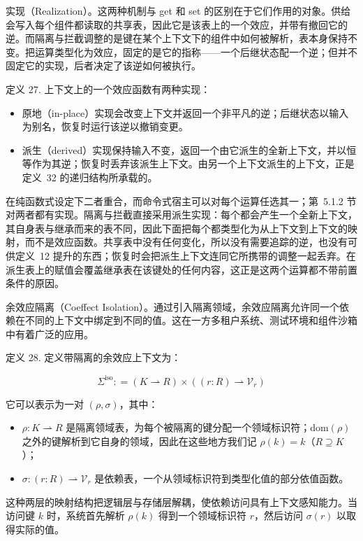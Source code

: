 实现（Realization）。这两种机制与 get 和 set 的区别在于它们作用的对象。供给会写入每个组件都读取的共享表，因此它是该表上的一个效应，并带有撤回它的逆。而隔离与拦截调整的是键在某个上下文下的组件中如何被解析，表本身保持不变。把运算类型化为效应，固定的是它的指称——一个后继状态配一个逆；但并不固定它的实现，后者决定了该逆如何被执行。

定义 27. 上下文上的一个效应函数有两种实现：

\begin{itemize}
\item 原地（in-place）实现会改变上下文并返回一个非平凡的逆；后继状态以输入为别名，恢复时运行该逆以撤销变更。
\item 派生（derived）实现保持输入不变，返回一个由它派生的全新上下文，并以恒等作为其逆；恢复时丢弃该派生上下文。由另一个上下文派生的上下文，正是定义~32 的递归结构所承载的。
\end{itemize}

在纯函数式设定下二者重合，而命令式宿主可以对每个运算任选其一；第~5.1.2 节对两者都有实现。隔离与拦截直接采用派生实现：每个都会产生一个全新上下文，其自身表与继承而来的表不同，因此下面把每个都类型化为从上下文到上下文的映射，而不是效应函数。共享表中没有任何变化，所以没有需要追踪的逆，也没有可供定义~12 提升的东西；恢复时会把派生上下文连同它所携带的调整一起丢弃。在派生表上的赋值会覆盖继承表在该键处的任何内容，这正是这两个运算都不带前置条件的原因。

余效应隔离（Coeffect Isolation）。通过引入隔离领域，余效应隔离允许同一个依赖在不同的上下文中绑定到不同的值。这在一方多租户系统、测试环境和组件沙箱中有着广泛的应用。

定义 28. 定义带隔离的余效应上下文为：

\[
\Sigma ^ { \mathrm { i s o } } : = ( K \rightharpoonup R ) \times ( ( r : R ) \rightharpoonup \mathcal { V } _ { r } )\tag{27}
\]

它可以表示为一对 \(( \rho , \sigma )\)，其中：

\begin{itemize}
\item \(\rho : K \rightharpoonup R\) 是隔离领域表，为每个被隔离的键分配一个领域标识符；dom\(( \rho )\) 之外的键解析到它自身的领域，因此在这些地方我们记 \(\rho ( k ) = k\)（\(R \supseteq K\)）；
\item \(\sigma : ( r : R ) \rightharpoonup \mathcal { V } _ { r }\) 是依赖表，一个从领域标识符到类型化值的部分依值函数。
\end{itemize}

这种两层的映射结构把逻辑层与存储层解耦，使依赖访问具有上下文感知能力。当访问键 \(k\) 时，系统首先解析 \(\rho ( k )\) 得到一个领域标识符 \(r\)，然后访问 \(\sigma ( r )\) 以取得实际的值。

